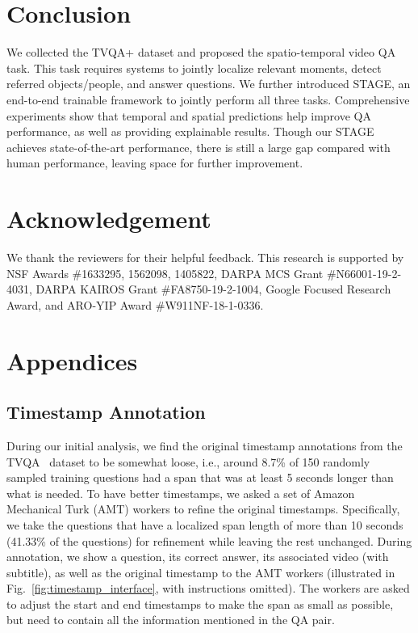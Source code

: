 \documentclass[11pt,a4paper]{article}
\begin{document}
\section{Conclusion}\label{conclusion}

We collected the TVQA+ dataset and proposed the spatio-temporal video QA task. 
This task requires systems to jointly localize relevant moments, detect referred objects/people, and answer questions. 
We further introduced STAGE, an end-to-end trainable framework to jointly perform all three tasks.
Comprehensive experiments show that temporal and spatial predictions help improve QA performance, as well as providing explainable results. 
Though our STAGE achieves state-of-the-art performance, there is still a large gap compared with human performance, leaving space for further improvement.


\section*{Acknowledgement}
We thank the reviewers for their helpful feedback. This research is supported by NSF Awards \#1633295, 1562098, 1405822, DARPA MCS Grant \#N66001-19-2-4031, DARPA KAIROS Grant \#FA8750-19-2-1004, Google Focused Research Award, and ARO-YIP Award \#W911NF-18-1-0336.





\appendix
\section{Appendices}\label{sec:appendix}

\subsection{Timestamp Annotation}
During our initial analysis, we find the original timestamp annotations from the TVQA~\cite{lei2018tvqa} dataset to be somewhat loose, i.e., around 8.7\% of 150 randomly sampled training questions had a span that was at least 5 seconds longer than what is needed. To have better timestamps, we asked a set of Amazon Mechanical Turk (AMT) workers to refine the original timestamps. Specifically, we take the questions that have a localized span length of more than 10 seconds (41.33\% of the questions) for refinement while leaving the rest unchanged. During annotation, we show a question, its correct answer, its associated video (with subtitle), as well as the original timestamp to the AMT workers (illustrated in Fig.~\ref{fig:timestamp_interface}, with instructions omitted). The workers are asked to adjust the start and end timestamps to make the span as small as possible, but need to contain all the information mentioned in the QA pair.
\end{document}
